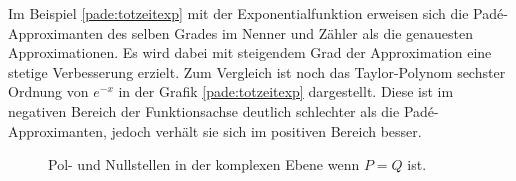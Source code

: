 Im Beispiel \ref{pade:totzeitexp} mit der Exponentialfunktion erweisen sich die Padé-Approximanten des selben Grades im Nenner und Zähler als die genauesten Approximationen.
Es wird dabei mit steigendem Grad der Approximation eine stetige Verbesserung erzielt.
Zum Vergleich ist noch das Taylor-Polynom sechster Ordnung von $e^{-x}$
in der Grafik \ref{pade:totzeitexp} dargestellt. 
Diese ist im negativen Bereich der Funktionsachse deutlich schlechter als die Padé-Approximanten, jedoch verhält sie sich im positiven Bereich besser.

\begin{figure}
\centering
{}
\caption{Pol- und Nullstellen in der komplexen Ebene wenn $P=Q$ ist.
\label{pade:poles1}}
\end{figure}
%
